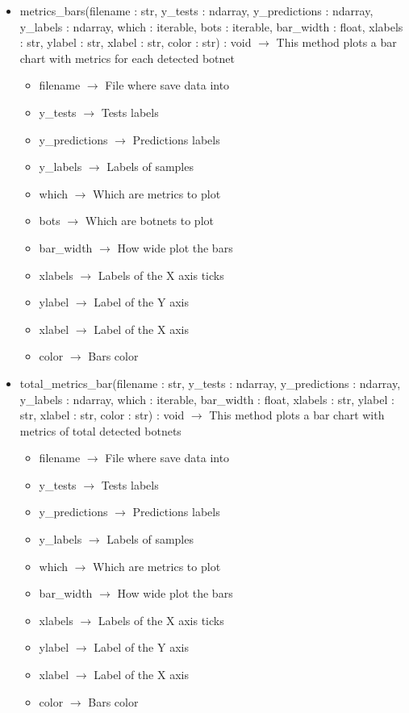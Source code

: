 \begin{description}
\begin{itemize}
\item metrics\_bars(filename : str, y\_tests : ndarray, y\_predictions : ndarray, y\_labels : ndarray, which : iterable, bots : iterable, bar\_width : float, xlabels : str, ylabel : str, xlabel : str, color : str) : void $\rightarrow$ This method plots a bar chart with metrics for each detected botnet\begin{itemize}
\item filename $\rightarrow$ File where save data into
\item y\_tests $\rightarrow$ Tests labels
\item y\_predictions $\rightarrow$ Predictions labels
\item y\_labels $\rightarrow$ Labels of samples
\item which $\rightarrow$ Which are metrics to plot
\item bots $\rightarrow$ Which are botnets to plot
\item bar\_width $\rightarrow$ How wide plot the bars
\item xlabels $\rightarrow$ Labels of the X axis ticks
\item ylabel $\rightarrow$ Label of the Y axis
\item xlabel $\rightarrow$ Label of the X axis
\item color $\rightarrow$ Bars color
\end{itemize}

\item total\_metrics\_bar(filename : str, y\_tests : ndarray, y\_predictions : ndarray, y\_labels : ndarray, which : iterable, bar\_width : float, xlabels : str, ylabel : str, xlabel : str, color : str) : void $\rightarrow$ This method plots a bar chart with metrics of total detected botnets\begin{itemize}
\item filename $\rightarrow$ File where save data into
\item y\_tests $\rightarrow$ Tests labels
\item y\_predictions $\rightarrow$ Predictions labels
\item y\_labels $\rightarrow$ Labels of samples
\item which $\rightarrow$ Which are metrics to plot
\item bar\_width $\rightarrow$ How wide plot the bars
\item xlabels $\rightarrow$ Labels of the X axis ticks
\item ylabel $\rightarrow$ Label of the Y axis
\item xlabel $\rightarrow$ Label of the X axis
\item color $\rightarrow$ Bars color
\end{itemize}

\end{itemize}

\end{description}
